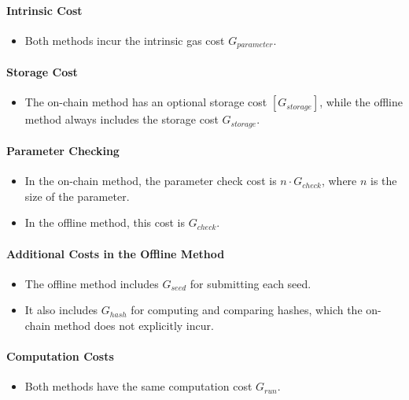 \documentclass[runningheads]{llncs}
\begin{document}
\paragraph*{Intrinsic Cost}
\begin{itemize}
    \item Both methods incur the intrinsic gas cost \( G_{parameter} \).
\end{itemize}

\paragraph*{Storage Cost}
\begin{itemize}
    \item The on-chain method has an optional storage cost \( [G_{storage}] \), while the offline method always includes the storage cost \( G_{storage} \).
\end{itemize}

\paragraph*{Parameter Checking}
\begin{itemize}
    \item In the on-chain method, the parameter check cost is \( n \cdot G_{check} \), where \( n \) is the size of the parameter.
    \item In the offline method, this cost is \( G_{check} \).
\end{itemize}

\paragraph*{Additional Costs in the Offline Method}
\begin{itemize}
    \item The offline method includes \(  G_{seed} \) for submitting each seed.
    \item It also includes \(  G_{hash} \) for computing and comparing hashes, which the on-chain method does not explicitly incur.
\end{itemize}

\paragraph*{Computation Costs}
\begin{itemize}
    \item Both methods have the same computation cost \( G_{run} \).
\end{itemize}
\end{document}
